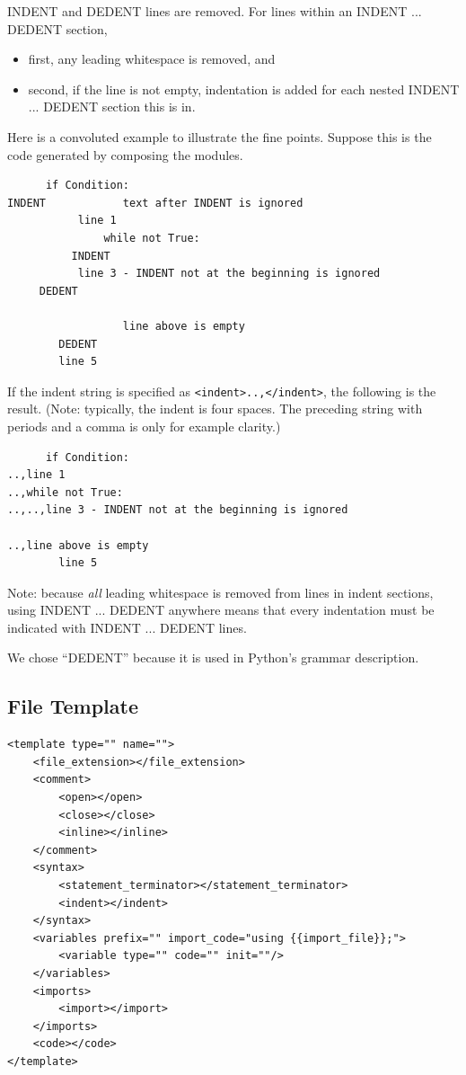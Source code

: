 \documentclass[12pt]{article}
\begin{document}
INDENT and DEDENT lines are removed.
For lines within an INDENT ... DEDENT section,
\begin{itemize}[nosep]
\item first, any leading whitespace is removed, and
\item second, if the line is not empty, indentation is added for each nested
  INDENT ... DEDENT section this is in.
\end{itemize}

Here is a convoluted example to illustrate the fine points.  Suppose this is the
code generated by composing the modules.
\begin{verbatim}
      if Condition:
INDENT            text after INDENT is ignored
           line 1
               while not True:
          INDENT
           line 3 - INDENT not at the beginning is ignored
     DEDENT

                  line above is empty
        DEDENT
        line 5
\end{verbatim}
If the indent string is specified as \verb|<indent>..,</indent>|, the following is
the result. (Note: typically, the indent is four spaces. The preceding string with
periods and a comma is only for example clarity.)
\begin{verbatim}
      if Condition:
..,line 1
..,while not True:
..,..,line 3 - INDENT not at the beginning is ignored

..,line above is empty
        line 5
\end{verbatim}

Note: because \emph{all} leading whitespace is removed from lines in indent sections,
using INDENT ... DEDENT anywhere means that every indentation must be indicated
with INDENT ... DEDENT lines.

We chose ``DEDENT'' because it is used in Python's grammar description.


\subsection{File Template}
\label{sec: file template}

\begin{verbatim}
<template type="" name="">
    <file_extension></file_extension>
    <comment>
        <open></open>
        <close></close>
        <inline></inline>
    </comment>
    <syntax>
        <statement_terminator></statement_terminator>
        <indent></indent>
    </syntax>
    <variables prefix="" import_code="using {{import_file}};">
        <variable type="" code="" init=""/>
    </variables>
    <imports>
        <import></import>
    </imports>
    <code></code>
</template>
\end{verbatim}
\end{document}
